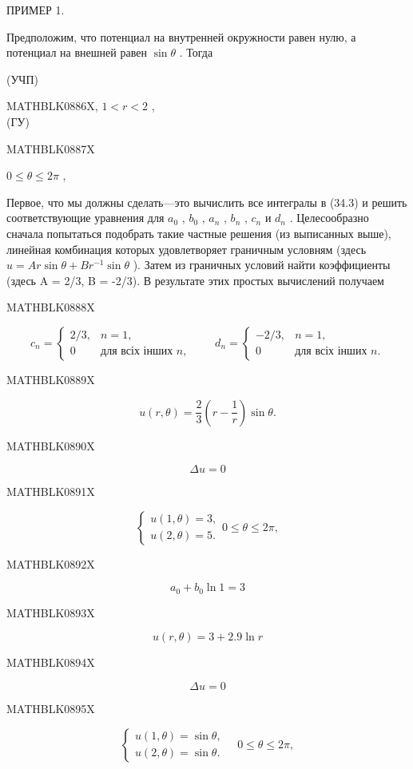 \documentclass[
  ukrainian,
]{article}
\begin{document}
ПРИМЕР 1.

Предположим, что потенциал на внутренней окружности равен нулю, а
потенциал на внешней равен \(\sin\theta\) . Тогда

(УЧП)

MATHBLK0886X, \(1 < r < 2\) ,\\
(ГУ)

MATHBLK0887X

\(0 \le \theta \le 2\pi\) ,

Первое, что мы должны сделать---это вычислить все интегралы в (34.3) и
решить соответствующие уравнения для \(a_0\) , \(b_0\) , \(a_n\) ,
\(b_n\) , \(c_n\) и \(d_n\) . Целесообразно сначала попытаться подобрать
такие частные решения (из выписанных выше), линейная комбинация которых
удовлетворяет граничным условням (здесь
\(u = Ar \sin \theta + Br^{-1} \sin \theta\) ). Затем из граничных
условий найти коэффициенты (здесь A = 2/3, B = -2/3). В результате этих
простых вычислений получаем

MATHBLK0888X

\[
c_n=\begin{cases}
2/3, & n=1, \\
0 & \text{для всіх інших } n,
\end{cases}
\qquad d_n=\begin{cases}
-2/3, & n=1, \\
0 & \text{для всіх інших } n.
\end{cases}
\]

MATHBLK0889X

\[
u(r, \theta) = \frac{2}{3} \left(r - \frac{1}{r}\right) \sin \theta.
\]

MATHBLK0890X

\[
\Delta u = 0
\]

MATHBLK0891X

\[
\begin{cases} u(1, \theta) = 3, \\ u(2, \theta) = 5. \end{cases} 0 \le \theta \le 2\pi,
\]

MATHBLK0892X

\[
a_0 + b_0 \ln 1 = 3
\]

MATHBLK0893X

\[
u(r, \theta) = 3 + 2.9 \ln r
\]

MATHBLK0894X

\[
\Delta u = 0
\]

MATHBLK0895X

\[
\begin{cases} u(1, \theta) = \sin \theta, \\ u(2, \theta) = \sin \theta. \end{cases} \quad 0 \le \theta \le 2\pi,
\]
\end{document}
